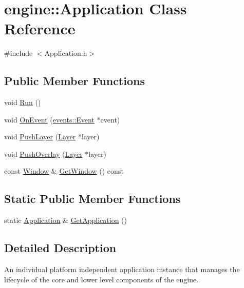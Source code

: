 \hypertarget{classengine_1_1Application}{}\section{engine\+:\+:Application Class Reference}
\label{classengine_1_1Application}


{\ttfamily \#include $<$Application.\+h$>$}

\subsection*{Public Member Functions}
\begin{DoxyCompactItemize}
\item 
void \hyperlink{classengine_1_1Application_a4dcdf08d920f7f63013a25cb1e80438b}{Run} ()
\item 
void \hyperlink{classengine_1_1Application_a093e14152fc1eda1b5eba682a2b4afd9}{On\+Event} (\hyperlink{classengine_1_1events_1_1Event}{events\+::\+Event} $\ast$event)
\item 
void \hyperlink{classengine_1_1Application_adb129a86a6cdbd80b25094d08605d213}{Push\+Layer} (\hyperlink{classengine_1_1Layer}{Layer} $\ast$layer)
\item 
void \hyperlink{classengine_1_1Application_a00041c455b5699665d21662be95abd85}{Push\+Overlay} (\hyperlink{classengine_1_1Layer}{Layer} $\ast$layer)
\item 
const \hyperlink{classengine_1_1Window}{Window} \& \hyperlink{classengine_1_1Application_a0c66a3ff294bcc497bb2e8eb7330124c}{Get\+Window} () const
\end{DoxyCompactItemize}
\subsection*{Static Public Member Functions}
\begin{DoxyCompactItemize}
\item 
static \hyperlink{classengine_1_1Application}{Application} \& \hyperlink{classengine_1_1Application_a639cdab87d3c5a14d0a9e9203d6c7c97}{Get\+Application} ()
\end{DoxyCompactItemize}


\subsection{Detailed Description}
An individual platform independent application instance that manages the lifecycle of the core and lower level components of the engine. 

